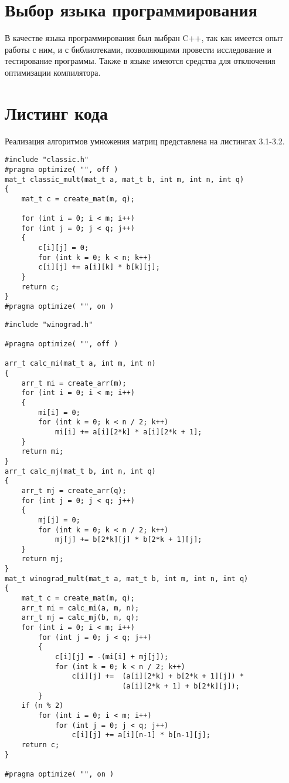 \section{Выбор языка программирования}
В качестве языка программирования был выбран C++, так как имеется опыт работы с ним, и с библиотеками, позволяющими провести исследование и тестирование программы. Также в языке имеются средства для отключения оптимизации компилятора.


\section{Листинг кода}
Реализация алгоритмов умножения матриц представлена на листингах 3.1-3.2.

\begin{lstlisting}[caption = Функция умножения матриц классическим алгоритмом.]
#include "classic.h"
#pragma optimize( "", off )
mat_t classic_mult(mat_t a, mat_t b, int m, int n, int q)
{
	mat_t c = create_mat(m, q);
	
	for (int i = 0; i < m; i++)
	for (int j = 0; j < q; j++)
	{
		c[i][j] = 0;
		for (int k = 0; k < n; k++)
		c[i][j] += a[i][k] * b[k][j];
	}
	return c;
}
#pragma optimize( "", on )
\end{lstlisting}

\begin{lstlisting}[caption = Функция умножения матриц алгоритмом Винограда.]
#include "winograd.h"

#pragma optimize( "", off )

arr_t calc_mi(mat_t a, int m, int n)
{
	arr_t mi = create_arr(m);
	for (int i = 0; i < m; i++)
	{
		mi[i] = 0;
		for (int k = 0; k < n / 2; k++)
			mi[i] += a[i][2*k] * a[i][2*k + 1];
	}
	return mi;
}
arr_t calc_mj(mat_t b, int n, int q)
{
	arr_t mj = create_arr(q);
	for (int j = 0; j < q; j++)
	{
		mj[j] = 0;
		for (int k = 0; k < n / 2; k++)
			mj[j] += b[2*k][j] * b[2*k + 1][j];
	}
	return mj;
}
mat_t winograd_mult(mat_t a, mat_t b, int m, int n, int q)
{
	mat_t c = create_mat(m, q);
	arr_t mi = calc_mi(a, m, n);
	arr_t mj = calc_mj(b, n, q);
	for (int i = 0; i < m; i++)
		for (int j = 0; j < q; j++)
		{
			c[i][j] = -(mi[i] + mj[j]);
			for (int k = 0; k < n / 2; k++)
				c[i][j] +=	(a[i][2*k] + b[2*k + 1][j]) * 
							(a[i][2*k + 1] + b[2*k][j]);
		}
	if (n % 2)
		for (int i = 0; i < m; i++)
			for (int j = 0; j < q; j++)
				c[i][j] += a[i][n-1] * b[n-1][j];
	return c;
}

#pragma optimize( "", on )
\end{lstlisting}

